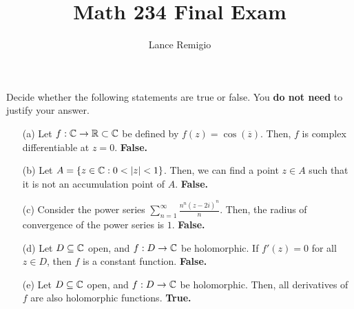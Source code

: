 \documentclass[a4paper]{article}
\title{Math 234 Final Exam}
\author{Lance Remigio}
\begin{document}
\maketitle

\begin{problem} 
   Decide whether the following statements are true or false. You \textbf{do not need} to justify your answer. 
   \begin{enumerate}
       \item[(a)] Let \( f: \mathbb{C} \to \mathbb{R} \subset \mathbb{C}  \) be defined by \( f(z) = \cos(\overline{z}) \). Then, \( f  \) is complex differentiable at \( z = 0  \). \textbf{False.}
       \item[(b)] Let \( A = \{ z \in \mathbb{C} : 0 < | z  |  < 1  \}  \). Then, we can find a point \( z \in A  \) such that it is not an accumulation point of \( A  \). \textbf{False.}
        \item[(c)] Consider the power series \( \sum_{ n=1  }^{ \infty  } \frac{ n^{n} (z - 2i)^{n} }{ n }  \). Then, the radius of convergence of the power series is \( 1  \). \textbf{False.}
        \item[(d)] Let \( D \subseteq  \mathbb{C}  \) open, and \( f: D \to \mathbb{C}  \) be holomorphic. If \( f'(z) = 0  \) for all \( z \in D  \), then \( f  \) is a constant function. \textbf{False.}
        \item[(e)] Let \( D \subseteq  \mathbb{C}   \) open, and \( f : D \to \mathbb{C}  \) be holomorphic. Then, all derivatives of \( f  \) are also holomorphic functions. \textbf{True.}
    \end{enumerate}
\end{problem}
\end{document}
